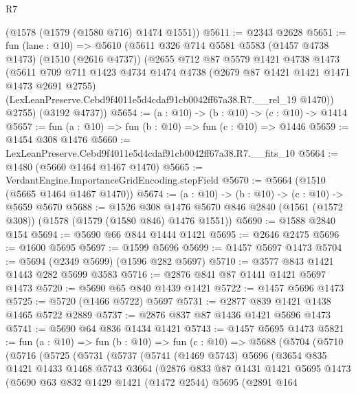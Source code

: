 \begin{lexlean}{R7}
\begin{coremodule}
    (@1578 (@1579 (@1580 @716) @1474 @1551))
@5611 := @2343 @2628
@5651 := fun (lane : @10) =>
  @5610
    (@5611
      @326
      @714
      @5581
      @5583
      (@1457 @4738 @1473)
      (@1510 (@2616 @4737))
      (@2655
        @712
        @87
        @5579
        @1421
        @4738
        @1473
        (@5611
          @709
          @711
          @1423
          @4734
          @1474
          @4738
          (@2679 @87 @1421 @1421 @1471 @1473 @2691 @2755)
          (LexLeanPreserve.Cebd9f4011e5d4cdaf91cb0042ff67a38.R7.__rel_19 @1470))
        @2755)
      (@3192 @4737))
@5654 := (a : @10) -> (b : @10) -> (c : @10) -> @1414
@5657 := fun (a : @10) => fun (b : @10) => fun (c : @10) => @1446
@5659 := @1454 @308 @1476
@5660 := LexLeanPreserve.Cebd9f4011e5d4cdaf91cb0042ff67a38.R7.__fits_10
@5664 := @1480 (@5660 @1464 @1467 @1470)
@5665 := VerdantEngine.ImportanceGridEncoding.stepField
@5670 := @5664 (@1510 (@5665 @1464 @1467 @1470))
@5674 := (a : @10) -> (b : @10) -> (c : @10) -> @5659 @5670
@5688 := @1526
    @308
    @1476
    @5670
    @846
    @2840
    (@1561 (@1572 @308))
    (@1578 (@1579 (@1580 @846) @1476 @1551))
@5690 := @1588 @2840 @154
@5694 := @5690 @66 @844 @1444 @1421
@5695 := @2646 @2475
@5696 := @1600 @5695
@5697 := @1599 @5696
@5699 := @1457 @5697 @1473
@5704 := @5694 (@2349 @5699) (@1596 @282 @5697)
@5710 := @3577 @843 @1421 @1443 @282 @5699 @3583
@5716 := @2876 @841 @87 @1441 @1421 @5697 @1473
@5720 := @5690 @65 @840 @1439 @1421
@5722 := @1457 @5696 @1473
@5725 := @5720 (@1466 @5722) @5697
@5731 := @2877 @839 @1421 @1438 @1465 @5722 @2889
@5737 := @2876 @837 @87 @1436 @1421 @5696 @1473
@5741 := @5690 @64 @836 @1434 @1421
@5743 := @1457 @5695 @1473
@5821 := fun (a : @10) =>
  fun (b : @10) =>
  fun (c : @10) =>
  @5688
    (@5704
      (@5710
        (@5716
          (@5725
            (@5731
              (@5737
                (@5741
                  (@1469 @5743)
                  @5696
                  (@3654
                    @835
                    @1421
                    @1433
                    @1468
                    @5743
                    @3664
                    (@2876
                      @833
                      @87
                      @1431
                      @1421
                      @5695
                      @1473
                      (@5690
                        @63
                        @832
                        @1429
                        @1421
                        (@1472 @2544)
                        @5695
                        (@2891
                          @164

\end{coremodule}
\end{lexlean}

